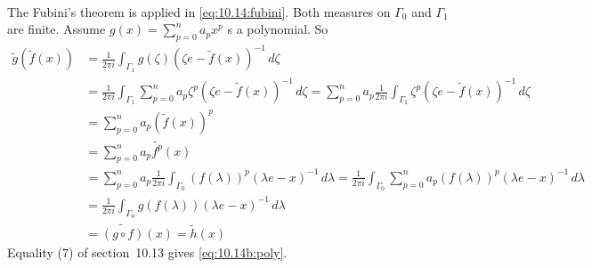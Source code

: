 \begin{enumerate}
\begin{itemize}
\begin{align}
\end{align}
The Fubini's theorem is applied in \eqref{eq:10.14:fubini}.
Both measures on \(\Gamma_0\) and \(\Gamma_1\) are finite.
Assume
\(g(x) = \sum_{p=0}^n a_p x^p\) s a polynomial. So
\begin{align}
\widetilde{g}\left(\widetilde{f}(x)\right)
  &= \frac{1}{2\pi i}\int_{\Gamma_1}
    g(\zeta)\left(\zeta e - \widetilde{f}(x)\right)^{-1}\,d\zeta \nonumber \\
  &=  \frac{1}{2\pi i}\int_{\Gamma_1}
        \sum_{p=0}^n
        a_p \zeta^p \left(\zeta e - \widetilde{f}(x)\right)^{-1}\,d\zeta
          \nonumber
   =  \sum_{p=0}^n
        a_p
        \frac{1}{2\pi i}
        \int_{\Gamma_1}
          \zeta^p \left(\zeta e - \widetilde{f}(x)\right)^{-1}\,d\zeta
            \nonumber \\
  &= \sum_{p=0}^n a_p \left(\widetilde{f}(x)\right)^p \label{eq:10.14b:poly} \\
  &= \sum_{p=0}^n a_p \widetilde{f^p}(x) \nonumber \\
  &= \sum_{p=0}^n a_p
    \frac{1}{2\pi i}
    \int_{\Gamma_0}
    (f(\lambda))^p(\lambda e - x)^{-1}\,d\lambda 
  = \frac{1}{2\pi i}\int_{\Gamma_0}
    \sum_{p=0}^n a_p(f(\lambda))^p(\lambda e - x)^{-1}\,d\lambda \nonumber \\
  &= \frac{1}{2\pi i}\int_{\Gamma_0} g(f(\lambda))(\lambda e - x)^{-1}\,d\lambda
    \nonumber \\
  &= \widetilde{(g\circ f)}(x) = \widetilde{h}(x) \nonumber
\end{align}
Equality (7) of section~10.13 gives \eqref{eq:10.14b:poly}.

\iffalse
Let \(f^p(x) = (f(x))^p\), from the other side:
\begin{align*}
\widetilde{h}(x) &= \widetilde{(g\circ f)}(x) \\
  &= \frac{1}{2\pi i}\int_{\Gamma_0} g(f(\lambda))(\lambda e - x)^{-1}\,d\lambda \\
  &= \frac{1}{2\pi i}\int_{\Gamma_0}
    \sum_{p=0}^n a_p(f(\lambda))^p(\lambda e - x)^{-1}\,d\lambda \\
  &= \sum_{p=0}^n a_p
    \frac{1}{2\pi i}
    \int_{\Gamma_0}
    (f(\lambda))^p(\lambda e - x)^{-1}\,d\lambda \\
  &= \sum_{p=0}^n a_p \widetilde{f^p}(x)
\end{align*}
\fi

\unfinished
\end{itemize}

\begin{excopy}
\end{excopy}
\unfinished

\end{enumerate}

